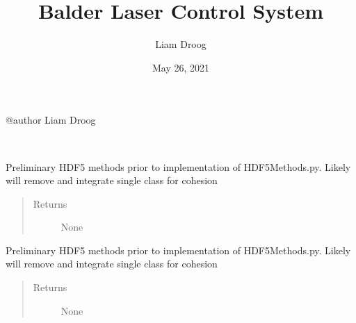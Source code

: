 \documentclass[letterpaper,10pt,english]{sphinxmanual}
\title{Balder Laser Control System}
\date{May 26, 2021}
\author{Liam Droog}
\begin{document}
\pagestyle{empty}
\sphinxmaketitle
\pagestyle{plain}
\sphinxtableofcontents
\pagestyle{normal}
\label{\detokenize{index::doc}}

\label{\detokenize{index:module-droogCNC}}
\sphinxAtStartPar
@author Liam Droog

\begin{fulllineitems}
\label{\detokenize{index:droogCNC.HDF5File}}~

\begin{fulllineitems}
\label{\detokenize{index:droogCNC.HDF5File.append}}
\sphinxAtStartPar
Preliminary HDF5 methods prior to implementation of HDF5Methods.py. Likely will remove and integrate single
class for cohesion
\begin{quote}\begin{description}
\item[{Returns}] \leavevmode
\sphinxAtStartPar
None

\end{description}\end{quote}

\end{fulllineitems}


\begin{fulllineitems}
\label{\detokenize{index:droogCNC.HDF5File.createDataset}}
\sphinxAtStartPar
Preliminary HDF5 methods prior to implementation of HDF5Methods.py. Likely will remove and integrate single
class for cohesion
\begin{quote}\begin{description}
\item[{Returns}] \leavevmode
\sphinxAtStartPar
None


\end{description}
\end{quote}
\end{fulllineitems}
\end{fulllineitems}
\end{document}
